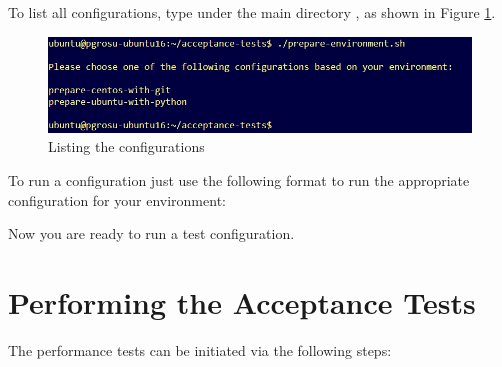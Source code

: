 To list all configurations, type under the main  directory , as shown in Figure \ref{fig:uat-prepare-environment-list}.


\begin{figure}[!h] %
\vspace{10mm}
\begin{center}
\includegraphics[scale=0.9]{figures/uat-prepare-environment-list.png}
\end{center}
\caption{Listing the  configurations}
\label{fig:uat-prepare-environment-list}
\end{figure}

To run a configuration just use the following format to run the appropriate configuration for your environment: \\

\begin{center}
\end{center}

Now you are ready to run a test configuration.

\section{Performing the Acceptance Tests \\} 

The performance tests can be initiated via the following steps: \\

